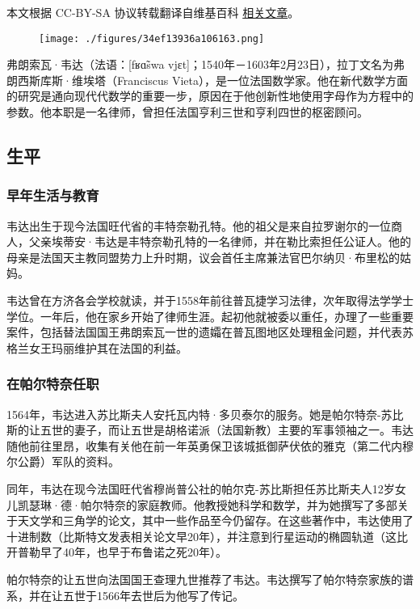 
本文根据 CC-BY-SA 协议转载翻译自维基百科 \href{ https://en.wikipedia.org/wiki/Fran\%C3\%A7ois_Vi\%C3\%A8te}{相关文章}。

\begin{figure}[ht]
\centering
\texttt{[image: ./figures/34ef13936a106163.png]}
\caption{} \label{fig_WD_1}
\end{figure}
弗朗索瓦·韦达（法语：[fʁɑ̃swa vjɛt]；1540年－1603年2月23日），拉丁文名为弗朗西斯库斯·维埃塔（Franciscus Vieta），是一位法国数学家。他在新代数学方面的研究是通向现代代数学的重要一步，原因在于他创新性地使用字母作为方程中的参数。他本职是一名律师，曾担任法国亨利三世和亨利四世的枢密顾问。
\subsection{生平}
\subsubsection{早年生活与教育}
韦达出生于现今法国旺代省的丰特奈勒孔特。他的祖父是来自拉罗谢尔的一位商人，父亲埃蒂安·韦达是丰特奈勒孔特的一名律师，并在勒比索担任公证人。他的母亲是法国天主教同盟势力上升时期，议会首任主席兼法官巴尔纳贝·布里松的姑妈。

韦达曾在方济各会学校就读，并于1558年前往普瓦捷学习法律，次年取得法学学士学位。一年后，他在家乡开始了律师生涯。起初他就被委以重任，办理了一些重要案件，包括替法国国王弗朗索瓦一世的遗孀在普瓦图地区处理租金问题，并代表苏格兰女王玛丽维护其在法国的利益。
\subsubsection{在帕尔特奈任职}
1564年，韦达进入苏比斯夫人安托瓦内特·多贝泰尔的服务。她是帕尔特奈-苏比斯的让五世的妻子，而让五世是胡格诺派（法国新教）主要的军事领袖之一。韦达随他前往里昂，收集有关他在前一年英勇保卫该城抵御萨伏依的雅克（第二代内穆尔公爵）军队的资料。

同年，韦达在现今法国旺代省穆尚普公社的帕尔克-苏比斯担任苏比斯夫人12岁女儿凯瑟琳·德·帕尔特奈的家庭教师。他教授她科学和数学，并为她撰写了多部关于天文学和三角学的论文，其中一些作品至今仍留存。在这些著作中，韦达使用了十进制数（比斯特文发表相关论文早20年），并注意到行星运动的椭圆轨道（这比开普勒早了40年，也早于布鲁诺之死20年）。

帕尔特奈的让五世向法国国王查理九世推荐了韦达。韦达撰写了帕尔特奈家族的谱系，并在让五世于1566年去世后为他写了传记。

